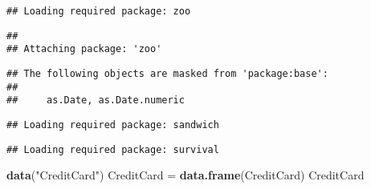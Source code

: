 \documentclass[]{article}
\newenvironment{Shaded}{\begin{snugshade}}{\end{snugshade}}
\newcommand{\KeywordTok}[1]{\textcolor[rgb]{0.13,0.29,0.53}{\textbf{#1}}}
\newcommand{\NormalTok}[1]{#1}
\newcommand{\StringTok}[1]{\textcolor[rgb]{0.31,0.60,0.02}{#1}}
\begin{document}
\begin{verbatim}
## Loading required package: zoo
\end{verbatim}

\begin{verbatim}
## 
## Attaching package: 'zoo'
\end{verbatim}

\begin{verbatim}
## The following objects are masked from 'package:base':
## 
##     as.Date, as.Date.numeric
\end{verbatim}

\begin{verbatim}
## Loading required package: sandwich
\end{verbatim}

\begin{verbatim}
## Loading required package: survival
\end{verbatim}

\begin{Shaded}
\begin{Highlighting}[]
\KeywordTok{data}\NormalTok{(}\StringTok{"CreditCard"}\NormalTok{)}
\NormalTok{CreditCard =}\StringTok{ }\KeywordTok{data.frame}\NormalTok{(CreditCard)}
\NormalTok{CreditCard}
\end{Highlighting}
\end{Shaded}
\end{document}
